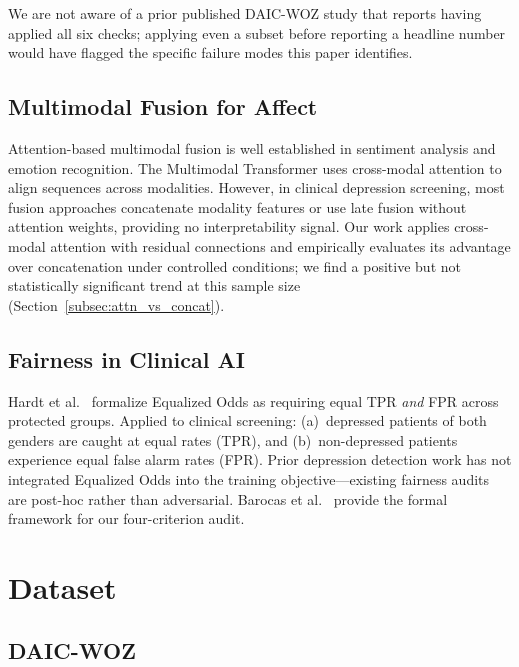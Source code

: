 \documentclass[journal]{IEEEtran}
\begin{document}
We are not aware of a prior published DAIC-WOZ study that reports
having applied all six checks; applying even a subset before
reporting a headline number would have flagged the specific failure
modes this paper identifies.

\subsection{Multimodal Fusion for Affect}

Attention-based multimodal fusion is well established in sentiment
analysis \cite{tsai2019multimodal} and emotion recognition. The
Multimodal Transformer \cite{tsai2019multimodal} uses cross-modal
attention to align sequences across modalities. However, in clinical
depression screening, most fusion approaches concatenate modality
features \cite{williamson2016} or use late fusion without attention
weights, providing no interpretability signal. Our work applies
cross-modal attention with residual connections and empirically
evaluates its advantage over concatenation under controlled
conditions; we find a positive but not statistically significant
trend at this sample size (Section~\ref{subsec:attn_vs_concat}).

\subsection{Fairness in Clinical AI}

Hardt et al.\ \cite{hardt2016} formalize Equalized Odds as requiring
equal TPR \emph{and} FPR across protected groups. Applied to clinical
screening: (a)~depressed patients of both genders are caught at equal
rates (TPR), and (b)~non-depressed patients experience equal false
alarm rates (FPR). Prior depression detection work has not integrated
Equalized Odds into the training objective---existing fairness audits
are post-hoc rather than adversarial. Barocas et al.\ \cite{barocas2019}
provide the formal framework for our four-criterion audit.

\section{Dataset}
\label{sec:dataset}

\subsection{DAIC-WOZ}
\end{document}
